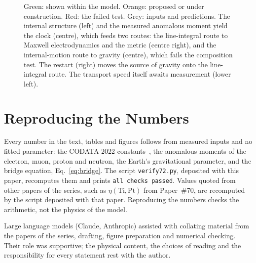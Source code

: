\documentclass[%
 reprint, amsmath,amssymb, aps, prb, ]{revtex4-2}
\numberwithin{equation}{section}
\begin{document}
\begin{figure}[t!]
\label{fig:flow}
\vspace{0.4em}
\begin{minipage}{0.95\textwidth}
\justifying\small
Green: shown within the model. Orange: proposed or under construction. Red: the failed test. Grey: inputs and predictions. The internal structure (left) and the measured anomalous moment yield the clock (centre), which feeds two routes: the line-integral route to Maxwell electrodynamics and the metric (centre right), and the internal-motion route to gravity (centre), which fails the composition test. The restart (right) moves the source of gravity onto the line-integral route. The transport speed itself awaits measurement (lower left).
\end{minipage}
\end{figure}

\clearpage
\appendix

\section{Reproducing the Numbers}
\label{app:repro}

Every number in the text, tables and figures follows from measured inputs and no fitted parameter: the CODATA 2022 constants~\cite{codata2022}, the anomalous moments of the electron, muon, proton and neutron, the Earth's gravitational parameter, and the bridge equation, Eq.~\eqref{eq:bridge}. The script \texttt{verify72.py}, deposited with this paper, recomputes them and prints \texttt{all checks passed}. Values quoted from other papers of the series, such as $\eta(\mathrm{Ti},\mathrm{Pt})$ from Paper~\#70, are recomputed by the script deposited with that paper. Reproducing the numbers checks the arithmetic, not the physics of the model.

\begin{acknowledgments}
Large language models (Claude, Anthropic) assisted with collating material from the papers of the series, drafting, figure preparation and numerical checking. Their role was supportive; the physical content, the choices of reading and the responsibility for every statement rest with the author.
\end{acknowledgments}
\end{document}
